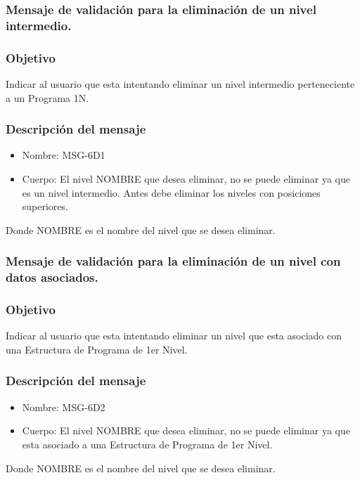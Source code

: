 \subsubsection{Mensaje de validación para la eliminación de un nivel intermedio.}\label{MSG-6D1}

\subsubsection{Objetivo}
Indicar al usuario que esta intentando eliminar un nivel intermedio perteneciente a un Programa 1N.

\subsubsection{Descripción del mensaje}
\begin{itemize}
\item Nombre: MSG-6D1
\item Cuerpo: El nivel NOMBRE que desea eliminar, no se puede eliminar ya que es un nivel intermedio. Antes debe eliminar los niveles con posiciones superiores.

\end{itemize}
Donde NOMBRE es el nombre del nivel que se desea eliminar.

\subsubsection{Mensaje de validación para la eliminación de un nivel con datos asociados.}\label{MSG-6D2}

\subsubsection{Objetivo}
Indicar al usuario que esta intentando eliminar un nivel que esta asociado con una Estructura de Programa de 1er Nivel.

\subsubsection{Descripción del mensaje}
\begin{itemize}
\item Nombre: MSG-6D2
\item Cuerpo: El nivel NOMBRE que desea eliminar, no se puede eliminar ya que esta asociado a una Estructura de Programa de 1er Nivel.
\end{itemize}
Donde NOMBRE es el nombre del nivel que se desea eliminar.


